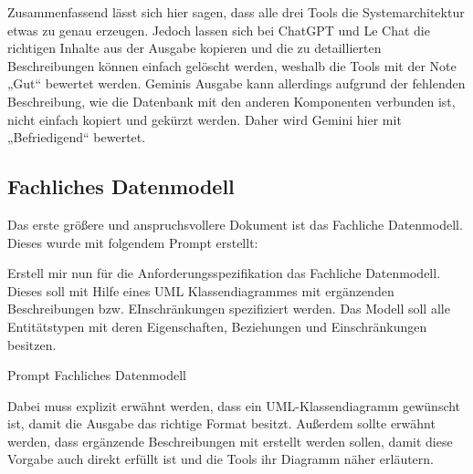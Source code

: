 Zusammenfassend lässt sich hier sagen, dass alle drei Tools die Systemarchitektur etwas zu genau erzeugen. Jedoch lassen sich bei ChatGPT 
und Le Chat die richtigen Inhalte aus der Ausgabe kopieren und die zu detaillierten Beschreibungen können einfach gelöscht werden, weshalb 
die Tools mit der Note „Gut“ bewertet werden. Geminis Ausgabe kann allerdings aufgrund der fehlenden Beschreibung, wie die Datenbank mit 
den anderen Komponenten verbunden ist, nicht einfach kopiert und gekürzt werden. Daher wird Gemini hier mit „Befriedigend“ bewertet.

\subsection*{Fachliches Datenmodell}

Das erste größere und anspruchsvollere Dokument ist das Fachliche Datenmodell. Dieses wurde mit folgendem Prompt erstellt:

\begin{prompt}[H]
    \begin{tcolorbox}[colback=gray!20, colframe=gray!20, boxrule=0pt, sharp corners] 
        Erstell mir nun für die Anforderungsspezifikation das Fachliche Datenmodell. Dieses soll mit Hilfe eines UML Klassendiagrammes mit ergänzenden Beschreibungen 
        bzw. EInschränkungen spezifiziert werden. Das Modell soll alle Entitätstypen mit deren Eigenschaften, Beziehungen und Einschränkungen besitzen.
        \vfill
    \end{tcolorbox}
    \caption{Prompt Fachliches Datenmodell}
    \label{Prompt Fachliches Datenmodell}
\end{prompt}

Dabei muss explizit erwähnt werden, dass ein UML-Klassendiagramm gewünscht ist, damit die Ausgabe das richtige Format besitzt. 
Außerdem sollte erwähnt werden, dass ergänzende Beschreibungen mit erstellt werden sollen, damit diese Vorgabe auch direkt erfüllt 
ist und die Tools ihr Diagramm näher erläutern.

